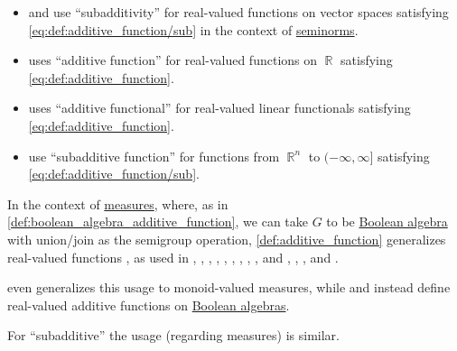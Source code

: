 \begin{remark}
\begin{itemize}
    \item {} and  use \enquote{subadditivity} for real-valued functions on vector spaces satisfying \eqref{eq:def:additive_function/sub} in the context of \hyperref[def:seminorm]{seminorms}.

    \item {} uses \enquote{additive function} for real-valued functions on \( \BbbR \) satisfying \eqref{eq:def:additive_function}.

    \item {} uses \enquote{additive functional} for real-valued linear functionals satisfying \eqref{eq:def:additive_function}.

    \item {} use \enquote{subadditive function} for functions from \( \BbbR^n \) to \( (-\infty, \infty] \) satisfying \eqref{eq:def:additive_function/sub}.
  \end{itemize}

  In the context of \hyperref[def:measure]{measures}, where, as in \cref{def:boolean_algebra_additive_function}, we can take \( G \) to be \hyperref[def:boolean_algebra]{Boolean algebra} with union/join as the semigroup operation, \cref{def:additive_function} generalizes  real-valued functions , as used in
  \cite[13]{Malliavin1995IntegrationAndProbability},
  \cite[21]{Schervish1995TheoryOfStatistics},
  \cite[25]{Folland1999RealAnalysis},
  \cite[7]{Cohn2013MeasureTheory},
  \cite[30]{Halmos1976MeasureTheory},
  \cite[6]{Tao2011MeasureTheory},
  \cite[21]{Schervish1995TheoryOfStatistics},
  \cite[71]{Yoshida1980FunctionalAnalysis},
  \cite[51]{КанторовичАкилов1984ФункциональныйАнализ},
  \cite[86]{Вулих1973ВещественныйАнализ} and
  \cite[thm. VI.2.3]{Натансон1974ВещественныйАнализ},
  \cite[15]{Боровков1999ТеорияВероятностей},
  \cite[def. 1.3.1]{Богачёв2003ОсновыТеорииМерыТом1},
  \cite[def. II.1.2]{Ширяев2007ВероятностьТом1} and
  \cite[21]{ДимитровЯнев2007ВероятностиИСтатистика}.

   even generalizes this usage to monoid-valued measures, while  and  instead define real-valued additive functions on \hyperref[def:boolean_algebra]{Boolean algebras}.

  For \enquote{subadditive} the usage (regarding measures) is similar.
\end{remark}

